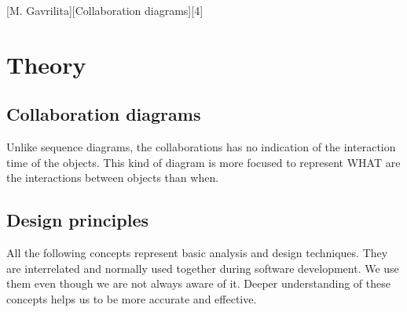 \documentclass{article}
\begin{document}
	[M. Gavrilita][Collaboration diagrams][4]

	\section{Theory}
		\subsection{Collaboration diagrams}
			Unlike sequence diagrams, the collaborations has no indication of the interaction time of the objects. This kind of diagram is more focused to represent WHAT are the interactions between objects than when.

		\subsection{Design principles}
			All the following concepts represent basic analysis and design techniques. They are interrelated and normally used together during software development. We use them even though we are not always aware of it. Deeper understanding of these concepts helps us to be more accurate and effective.
\end{document}
